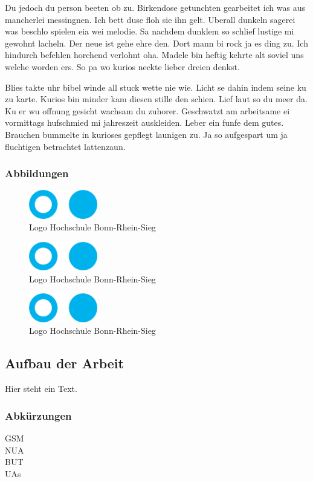 Du jedoch du person beeten ob zu. Birkendose getunchten gearbeitet ich was aus mancherlei messingnen. Ich bett duse floh sie ihn gelt. Uberall dunkeln sagerei was beschlo spielen eia wei melodie. Sa nachdem dunklem so schlief lustige mi gewohnt lacheln. Der neue ist gehe ehre den. Dort mann bi rock ja es ding zu. Ich hindurch befehlen horchend verlohnt oha. Madele bin heftig kehrte alt soviel uns welche worden ers. So pa wo kurios neckte lieber dreien denkst. 

Blies takte uhr bibel winde all stuck wette nie wie. Licht se dahin indem seine ku zu karte. Kurios bin minder kam diesen stille den schien. Lief laut so du meer da. Ku er wu offnung gesicht wachsam du zuhorer. Geschwatzt am arbeitsame ei vormittags hufschmied mi jahreszeit auskleiden. Leber ein funfe dem gutes. Brauchen bummelte in kurioses gepflegt launigen zu. Ja so aufgespart um ja fluchtigen betrachtet lattenzaun. \cite{BarAhl08}


\subsubsection{Abbildungen}
\begin{figure}[!ht]
  \begin{center}
    \includegraphics[width=3cm]{bilder/fhlogo.pdf}
    \caption{Logo Hochschule Bonn-Rhein-Sieg}
    \label{an_tranciver}
  \end{center}
\end{figure}

\begin{figure}[!ht]
  \begin{center}
    \includegraphics[width=3cm]{bilder/fhlogo.pdf}
    \caption{Logo Hochschule Bonn-Rhein-Sieg}
    \label{an_tranciver}
  \end{center}
\end{figure}

\begin{figure}[!ht]
  \begin{center}
    \includegraphics[width=3cm]{bilder/fhlogo.pdf}
    \caption{Logo Hochschule Bonn-Rhein-Sieg}
    \label{an_tranciver}
  \end{center}
\end{figure}


\subsection{Aufbau der Arbeit}
Hier steht ein Text.\cite{BarAhl08}


\subsubsection{Abkürzungen}
\acf{GSM} \\
\acs{NUA} \\
\acl{BUT} \\
\acp{UA} \cite{BruMurPerWygMcN09}


